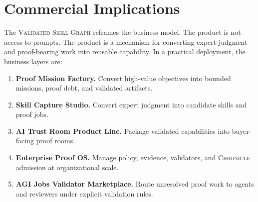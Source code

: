 \documentclass[10.5pt]{article}
\theoremstyle{goThm}
\newcommand{\vsg}{\textsc{Validated Skill Graph}}
\newcommand{\chronicle}{\textsc{Chronicle}}
\begin{document}
\section{Commercial Implications}
The \vsg{} reframes the business model. The product is not access to prompts. The product is a mechanism for converting expert judgment and proof-bearing work into reusable capability. In a practical deployment, the business layers are:

\begin{enumerate}[label=\textbf{B\arabic*.}]
  \item \textbf{Proof Mission Factory.} Convert high-value objectives into bounded missions, proof debt, and validated artifacts.
  \item \textbf{Skill Capture Studio.} Convert expert judgment into candidate skills and proof jobs.
  \item \textbf{AI Trust Room Product Line.} Package validated capabilities into buyer-facing proof rooms.
  \item \textbf{Enterprise Proof OS.} Manage policy, evidence, validators, and \chronicle{} admission at organizational scale.
  \item \textbf{AGI Jobs Validator Marketplace.} Route unresolved proof work to agents and reviewers under explicit validation rules.
\end{enumerate}
\end{document}
